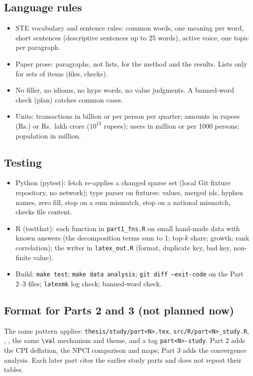 \documentclass[11pt,a4paper]{article}
\newcommand{\f}[1]{\texttt{#1}}
\begin{document}
\subsection{Language rules}
\begin{itemize}
  \item STE vocabulary and sentence rules: common words, one meaning per word, short sentences
        (descriptive sentences up to 25 words), active voice, one topic per paragraph.
  \item Paper prose: paragraphs, not lists, for the method and the results. Lists only for sets of
        items (files, checks).
  \item No filler, no idioms, no hype words, no value judgments. A banned-word check (plan) catches
        common cases.
  \item Units: transactions in billion or per person per quarter; amounts in rupees (Rs.) or Rs.\ lakh
        crore ($10^{12}$ rupees); users in million or per 1000 persons; population in million.
\end{itemize}

\subsection{Testing}
\begin{itemize}
  \item Python (pytest): fetch re-applies a changed sparse set (local Git fixture repository, no
        network); type parser on fixtures: values, merged ids, hyphen names, zero fill, stop on a sum
        mismatch, stop on a national mismatch, checks file content.
  \item R (testthat): each function in \f{part1\_fns.R} on small hand-made data with known answers
        (the decomposition terms sum to 1; top-$k$ share; growth; rank correlation); the writer in
        \f{latex\_out.R} (format, duplicate key, bad key, non-finite value).
  \item Build: \f{make test}; \f{make data analysis}; \f{git diff --exit-code} on the Part 2--3 files;
        \f{latexmk} log check; banned-word check.
\end{itemize}

\subsection{Format for Parts 2 and 3 (not planned now)}
The same pattern applies: \f{thesis/study/part<N>.tex}, \f{src/R/part<N>\_study.R},
, , the same
\verb|\val| mechanism and theme, and a tag \f{part<N>-study}. Part 2 adds the CPI deflation, the NPCI
comparison and maps; Part 3 adds the convergence analysis. Each later part cites the earlier study parts
and does not repeat their tables.
\end{document}
